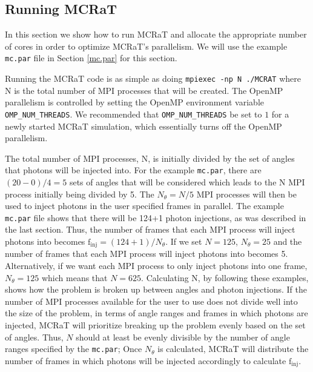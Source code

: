 \documentclass[12pt,a4paper]{article}
\begin{document}
\subsection{Running MCRaT}
In this section we show how to run MCRaT and allocate the appropriate number of cores in order to optimize MCRaT's parallelism. We will use the example \texttt{mc.par} file in Section \ref{mc.par} for this section. 

Running the MCRaT code is as simple as doing \texttt{mpiexec -np N ./MCRAT} where N is the total number of MPI processes that will be created. The OpenMP parallelism is controlled by setting the OpenMP environment variable \texttt{OMP\_NUM\_THREADS}. We recommended that \texttt{OMP\_NUM\_THREADS} be set to $1$ for a newly started MCRaT simulation, which essentially turns off the OpenMP parallelism. 

 The total number of MPI processes, N, is initially divided by the set of angles that photons will be injected into. For the example \texttt{mc.par}, there are $(20-0)/4=5$ sets of angles that will be considered which leads to the N MPI process initially being divided by 5. The $N_\theta=N/5$ MPI processes will then be used to inject photons in the user specified frames in parallel. The example \texttt{mc.par} file shows that there will be 124+1 photon injections, as was described in the last section. Thus, the number of frames that each MPI process will inject photons into becomes $\mathrm{f_{inj}}=(124+1)/N_\theta$. If we set $N=125$, $N_\theta=25$ and the number of frames that each MPI process will inject photons into becomes 5. Alternatively, if we want each MPI process to only inject photons into one frame, $N_\theta=125$ which means that $N=625$. Calculating N, by following these examples, shows how the problem is broken up between angles and photon injections. If the number of MPI processes available for the user to use does not divide well into the size of the problem, in terms of angle ranges and frames in which photons are injected, MCRaT will prioritize breaking up the problem evenly based on the set of angles. Thus, $N$ should at least be evenly divisible by the number of angle ranges specified by the \texttt{mc.par}; Once $N_\theta$ is calculated, MCRaT will distribute the number of frames in which photons will be injected accordingly to calculate $\mathrm{f_{inj}}$.
 
\end{document}
